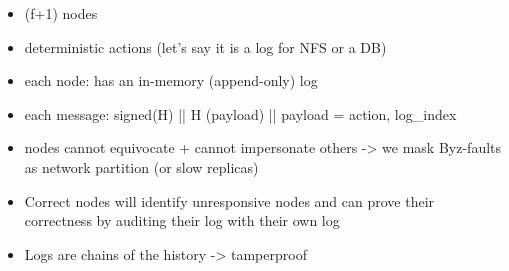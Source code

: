 



\begin{itemize}
    \item (f+1) nodes
    \item deterministic actions (let's say it is a log for NFS or a DB)
    \item each node: has an in-memory (append-only) log
    \item each message: signed(H) || H (payload) || payload = {action, log\_index}
    \item nodes cannot equivocate + cannot impersonate others -> we mask Byz-faults as network partition (or slow replicas)
    \item Correct nodes will identify unresponsive nodes and can prove their correctness by auditing their log with their own log
    \item Logs are chains of the history -> tamperproof
\end{itemize}
\fi





